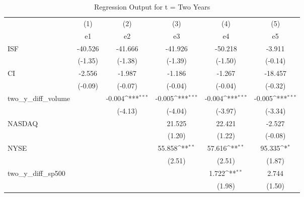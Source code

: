 \begin{table}[htbp]\centering
\def\sym#1{\ifmmode^{#1}\else\(^{#1}\)\fi}
\caption{Regression Output for t = Two Years}
\begin{tabular}{l*{5}{c}}
\hline\hline
            &\multicolumn{1}{c}{(1)}         &\multicolumn{1}{c}{(2)}         &\multicolumn{1}{c}{(3)}         &\multicolumn{1}{c}{(4)}         &\multicolumn{1}{c}{(5)}         \\
            &          e1         &          e2         &          e3         &          e4         &          e5         \\
\hline
ISF         &     -40.526         &     -41.666         &     -41.926         &     -50.218         &      -3.911         \\
            &     (-1.35)         &     (-1.38)         &     (-1.39)         &     (-1.50)         &     (-0.14)         \\
[1em]
CI          &      -2.556         &      -1.987         &      -1.186         &      -1.267         &     -18.457         \\
            &     (-0.09)         &     (-0.07)         &     (-0.04)         &     (-0.04)         &     (-0.32)         \\
[1em]
two\_y\_diff\_volume&                     &      -0.004\sym{***}&      -0.005\sym{***}&      -0.004\sym{***}&      -0.005\sym{***}\\
            &                     &     (-4.13)         &     (-4.04)         &     (-3.97)         &     (-3.34)         \\
[1em]
NASDAQ      &                     &                     &      21.525         &      22.421         &      -2.527         \\
            &                     &                     &      (1.20)         &      (1.22)         &     (-0.08)         \\
[1em]
NYSE        &                     &                     &      55.858\sym{**} &      57.616\sym{**} &      95.335\sym{*}  \\
            &                     &                     &      (2.51)         &      (2.51)         &      (1.87)         \\
[1em]
two\_y\_diff\_sp500&                     &                     &                     &       1.722\sym{**} &       2.744         \\
            &                     &                     &                     &      (1.98)         &      (1.50)         \\

\end{tabular}
\end{table}

